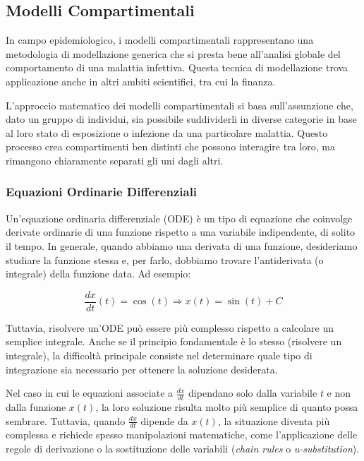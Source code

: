 \subsection{Modelli Compartimentali}

In campo epidemiologico, i modelli compartimentali rappresentano una 
metodologia di modellazione generica che si presta bene all'analisi 
globale del comportamento di una malattia infettiva. Questa tecnica di 
modellazione trova applicazione anche in altri ambiti scientifici, tra 
cui la finanza.

L'approccio matematico dei modelli compartimentali si basa sull'assunzione 
che, dato un gruppo di individui, sia possibile suddividerli in diverse 
categorie in base al loro stato di esposizione o infezione da una 
particolare malattia. Questo processo crea compartimenti ben distinti che 
possono interagire tra loro, ma rimangono chiaramente separati gli uni 
dagli altri.

\subsubsection*{Equazioni Ordinarie Differenziali}

Un'equazione ordinaria differenziale (ODE) è un tipo di equazione che 
coinvolge derivate ordinarie di una funzione rispetto a una variabile 
indipendente, di solito il tempo. In generale, quando abbiamo una 
derivata di una funzione, desideriamo studiare la funzione stessa e, 
per farlo, dobbiamo trovare l'antiderivata (o integrale) della funzione 
data. Ad esempio:

\[ \frac{dx}{dt}(t) = \cos(t) \Rightarrow x(t) = \sin(t) + C \]

Tuttavia, risolvere un'ODE può essere più complesso rispetto a calcolare 
un semplice integrale. Anche se il principio fondamentale è lo stesso 
(risolvere un integrale), la difficoltà principale consiste nel 
determinare quale tipo di integrazione sia necessario per ottenere 
la soluzione desiderata.

Nel caso in cui le equazioni associate a $\frac{dx}{dt}$ dipendano solo 
dalla variabile $t$ e non dalla funzione $x(t)$, la loro soluzione 
risulta molto più semplice di quanto possa sembrare. Tuttavia, quando 
$\frac{dx}{dt}$ dipende da $x(t)$, la situazione diventa più complessa e 
richiede spesso manipolazioni matematiche, come l'applicazione delle 
regole di derivazione o la sostituzione delle variabili 
(\emph{chain rules} o \emph{u-substitution}).


